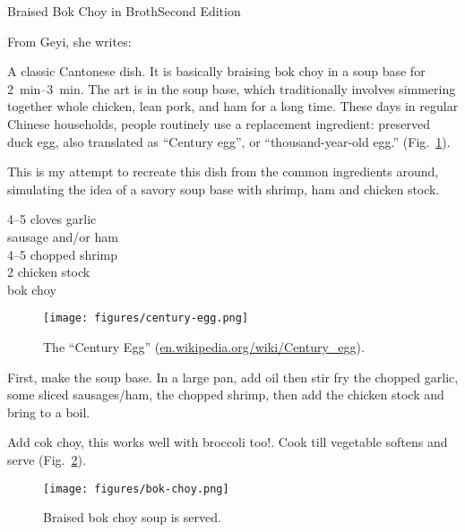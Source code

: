 \begin{entry}{Braised Bok Choy in Broth}{Second Edition}

\begin{open}
    From Geyi, she writes:

    A classic Cantonese dish. It is basically braising bok choy in a soup base
    for \SIrange{2}{3}{\minute}. The art is in the soup base, which
    traditionally involves simmering together whole chicken, lean pork, and ham
    for a long time. These days in regular Chinese households, people routinely
    use a replacement ingredient: preserved duck egg, also translated as
    ``Century egg'', or ``thousand-year-old egg.'' (Fig.~\ref{fig:century-egg}).

    This is my attempt to recreate this dish from the common ingredients around,
    simulating the idea of a savory soup base with shrimp, ham and chicken
    stock.
\end{open}
\begin{ingredients}
    \numrange{4}{5} cloves garlic\\
    sausage and/or ham\\
    \numrange{4}{5} chopped shrimp\\
    \SI{2}{\cup} chicken stock\\
    bok choy
\end{ingredients}
\begin{figure}[b]
    \centering
    \texttt{[image: figures/century-egg.png]}
    \caption{The ``Century Egg'' (\url{en.wikipedia.org/wiki/Century_egg}).}
    \label{fig:century-egg}
\end{figure}
First, make the soup base.  In a large pan, add oil then stir fry the chopped
garlic, some sliced sausages/ham, the chopped shrimp, then add the chicken stock
and bring to a boil.

Add cok choy, this works well with broccoli too!.  Cook till vegetable softens
and serve (Fig.~\ref{fig:bok-choy}).
\begin{figure}
    \centering
    \texttt{[image: figures/bok-choy.png]}
    \caption{Braised bok choy soup is served.}
    \label{fig:bok-choy}
\end{figure}
\end{entry}